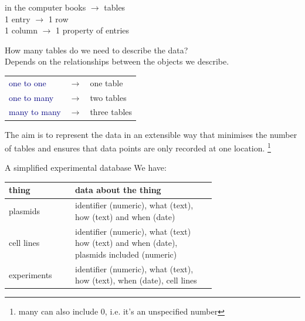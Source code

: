 \documentclass[pdf]{beamer}
\newcommand\blfootnote[1]{%
  \begingroup  %
  \renewcommand\thefootnote{}\footnote{#1}%
  \addtocounter{footnote}{-1}  %
  \endgroup
}
\begin{document}
\begin{frame}{in the computer}
  books $\rightarrow$ tables\\
  1 entry $\rightarrow$ 1 row\\
  1 column $\rightarrow$ 1 property of entries 

  \pause
  How many tables do we need to describe the data?\\
  Depends on the relationships between the objects we describe.

  \begin{tabular}{lcl}
    \textcolor{navy}{one to one} & $\rightarrow$  & one table\\
    \textcolor{navy}{one to many} & $\rightarrow$ & two tables\\
    \textcolor{navy}{many to many} & $\rightarrow$ & three tables \\
  \end{tabular}

  \pause
  The aim is to represent the data in an extensible way that minimises
  the number of tables and ensures that data points are only recorded
  at one location.
  \blfootnote{many can also include 0, i.e. it's an unspecified number}
\end{frame}

\begin{frame}{A simplified experimental database}
  We have:

  \begin{tabular}{p{0.2\linewidth}|p{0.5\linewidth}}
  thing & data about the thing \\
  \hline
  plasmids & identifier (numeric), what (text), how (text) and when (date) \\
  cell lines & identifier (numeric), what (text) how (text) and when (date), 
  plasmids included (numeric) \\
  experiments & identifier (numeric), what (text), how (text), when (date),
  cell lines\\
  \end{tabular}

\end{frame}
\end{document}
